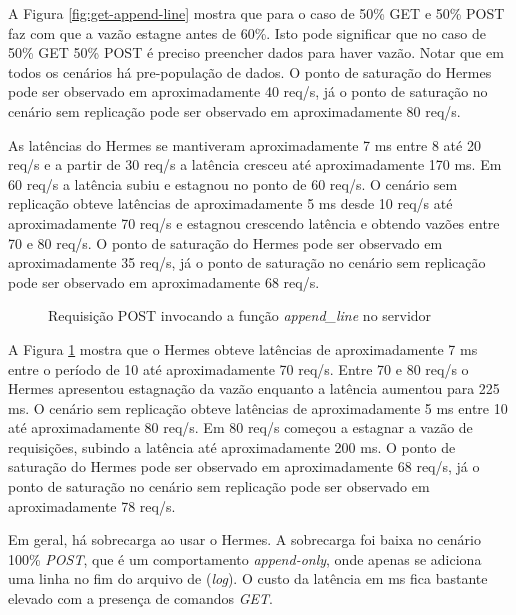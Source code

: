 A Figura \ref{fig:get-append-line} mostra que para o caso de 50\% GET e 50\% POST faz com que a vazão estagne antes de 60\%. Isto pode significar que no caso de 50\% GET 50\% POST é preciso preencher dados para haver vazão. Notar que em todos os cenários há pre-população de dados. O ponto de saturação do Hermes pode ser observado em aproximadamente 40 req/s, já o ponto de saturação no cenário sem replicação pode ser observado em aproximadamente 80 req/s.

As latências do Hermes se mantiveram aproximadamente 7 ms entre 8 até 20 req/s e a partir de 30 req/s a latência cresceu até aproximadamente 170 ms. Em 60 req/s a latência subiu e estagnou no ponto de 60 req/s. O cenário sem replicação obteve latências de aproximadamente 5 ms desde 10 req/s até aproximadamente 70 req/s e estagnou crescendo latência e obtendo vazões entre 70 e 80 req/s. O ponto de saturação do Hermes pode ser observado em aproximadamente 35 req/s, já o ponto de saturação no cenário sem replicação pode ser observado em aproximadamente 68 req/s.

\pagebreak

\begin{figure}[htb!]
\centering
\caption{Requisição POST invocando a função \textit{append\_line} no servidor}

\label{fig:append-line}
\end{figure}

A Figura \ref{fig:append-line} mostra que o Hermes obteve latências de aproximadamente 7 ms entre o período de 10 até aproximadamente 70 req/s. Entre 70 e 80 req/s o Hermes apresentou estagnação da vazão enquanto a latência aumentou para 225 ms. O cenário sem replicação obteve latências de aproximadamente 5 ms entre 10 até aproximadamente 80 req/s. Em 80 req/s começou a estagnar a vazão de requisições, subindo a latência até aproximadamente 200 ms. O ponto de saturação do Hermes pode ser observado em aproximadamente 68 req/s, já o ponto de saturação no cenário sem replicação pode ser observado em aproximadamente 78 req/s.

Em geral, há sobrecarga ao usar o Hermes. A sobrecarga foi baixa no cenário 100\% \textit{POST}, que é um comportamento \textit{append-only}, onde apenas se adiciona uma linha no fim do arquivo de (\textit{log}). O custo da latência em ms fica bastante elevado com a presença de comandos \textit{GET}.



